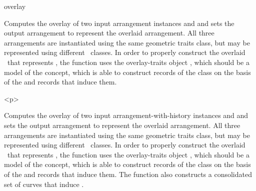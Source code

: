 
\ccRefPageBegin

\begin{ccRefFunction}{overlay}


   {Computes the overlay of two input arrangement instances  and
     and sets the output arrangement  to represent the
    overlaid arrangement. All three arrangements are instantiated using the
    same geometric traits class, but may be represented using different
    \dcel\ classes. In order to properly construct the overlaid \dcel\ that
    represents , the function uses the overlay-traits object
    , which should be a model of the  concept,
    which is able to construct records of the  class on the
    basis of the  and  records that induce them.
    }

\begin{ccHtmlOnly}<p>\end{ccHtmlOnly}


   {Computes the overlay of two input arrangement-with-history instances
     and  and sets the output arrangement 
    to represent the overlaid arrangement. All three arrangements are
    instantiated using the same geometric traits class, but may be represented
    using different \dcel\ classes. In order to properly construct the
    overlaid \dcel\ that represents , the function uses the
    overlay-traits object , which should be a model of the
     concept, which is able to construct records of the
     class on the basis of the  and 
    records that induce them. The function also constructs a consolidated set
    of curves that induce .}

\ccSeeAlso

\end{ccRefFunction}

\ccRefPageEnd
